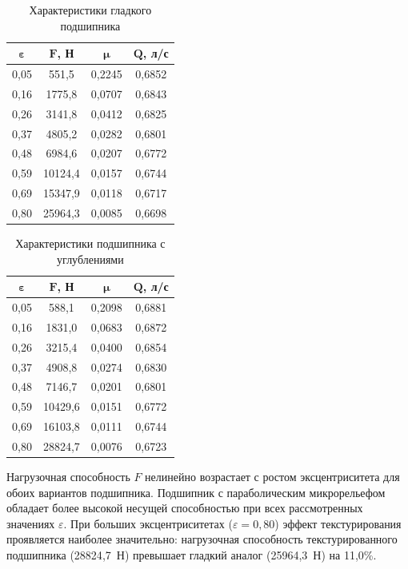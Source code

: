 \begin{table}[H]
\small
\centering
\caption{Характеристики гладкого подшипника}
\label{tab:smooth_results}
\begin{tabular}{|c|c|c|c|}
\hline
$\boldsymbol{\varepsilon}$ & $\boldsymbol{F}$\textbf{, Н} & $\boldsymbol{\mu}$ & $\boldsymbol{Q}$\textbf{, л/с} \\
\hline
0{,}05 & 551{,}5 & 0{,}2245 & 0{,}6852 \\
\hline
0{,}16 & 1775{,}8 & 0{,}0707 & 0{,}6843 \\
\hline
0{,}26 & 3141{,}8 & 0{,}0412 & 0{,}6825 \\
\hline
0{,}37 & 4805{,}2 & 0{,}0282 & 0{,}6801 \\
\hline
0{,}48 & 6984{,}6 & 0{,}0207 & 0{,}6772 \\
\hline
0{,}59 & 10124{,}4 & 0{,}0157 & 0{,}6744 \\
\hline
0{,}69 & 15347{,}9 & 0{,}0118 & 0{,}6717 \\
\hline
0{,}80 & 25964{,}3 & 0{,}0085 & 0{,}6698 \\
\hline
\end{tabular}
\end{table}

\begin{table}[H]
\small
\centering
\caption{Характеристики подшипника с \varDimpleTypeGenitive{} углублениями}
\label{tab:textured_results}
\begin{tabular}{|c|c|c|c|}
\hline
$\boldsymbol{\varepsilon}$ & $\boldsymbol{F}$\textbf{, Н} & $\boldsymbol{\mu}$ & $\boldsymbol{Q}$\textbf{, л/с} \\
\hline
0{,}05 & 588{,}1 & 0{,}2098 & 0{,}6881 \\
\hline
0{,}16 & 1831{,}0 & 0{,}0683 & 0{,}6872 \\
\hline
0{,}26 & 3215{,}4 & 0{,}0400 & 0{,}6854 \\
\hline
0{,}37 & 4908{,}8 & 0{,}0274 & 0{,}6830 \\
\hline
0{,}48 & 7146{,}7 & 0{,}0201 & 0{,}6801 \\
\hline
0{,}59 & 10429{,}6 & 0{,}0151 & 0{,}6772 \\
\hline
0{,}69 & 16103{,}8 & 0{,}0111 & 0{,}6744 \\
\hline
0{,}80 & 28824{,}7 & 0{,}0076 & 0{,}6723 \\
\hline
\end{tabular}
\end{table}

Нагрузочная способность $F$ нелинейно возрастает с ростом эксцентриситета для обоих вариантов подшипника. Подшипник с параболическим микрорельефом обладает более высокой несущей способностью при всех рассмотренных значениях $\varepsilon$. При больших эксцентриситетах ($\varepsilon = 0{,}80$) эффект текстурирования проявляется наиболее значительно: нагрузочная способность текстурированного подшипника (28824{,}7~Н) превышает гладкий аналог (25964{,}3~Н) на 11{,}0\%.

